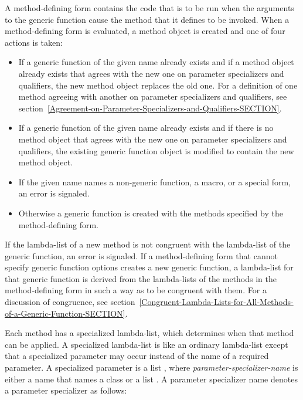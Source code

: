 A method-defining form contains the code that is to be run when the
arguments to the generic function cause the method that it defines to
be invoked.  When a method-defining form is evaluated, a method object
is created and one of four actions is taken:

\begin{itemize}

\item  If a generic function of the given name already exists
and if a method object already exists that agrees with the new one on
parameter specializers and qualifiers, the new method object replaces
the old one.  For a definition of one method agreeing with another on
parameter specializers and qualifiers, see
section~\ref{Agreement-on-Parameter-Specializers-and-Qualifiers-SECTION}.

\item  If a generic function of the given name already exists
and if there is no method object that agrees with the new one on
parameter specializers and qualifiers, the existing generic function
object is modified to contain the new method object.

\item  If the given name names a non-generic function, a macro,
or a special form, an error is signaled.

\item  Otherwise a generic function is created with the methods
specified by the method-defining form.

\end{itemize}

If the lambda-list of a new method is not congruent with the lambda-list
of the generic function, an error is signaled.  If a
method-defining form that cannot specify generic function options
creates a new generic function, a lambda-list for that generic
function is derived from the lambda-lists of the methods in the
method-defining form in such a way as to be congruent with them.  For
a discussion of {\bit congruence}, see
section~\ref{Congruent-Lambda-Lists-for-All-Methods-of-a-Generic-Function-SECTION}.

Each method has a {\bit specialized lambda-list}, which determines
when that method can be applied.  A specialized lambda-list is like
an ordinary lambda-list except that a {\bit specialized parameter\/}
may occur instead of the name of a required parameter.  A specialized parameter
is a list ,
where {\it parameter-specializer-name\/} is either
a name that names a class or a list .
A parameter specializer name denotes a parameter specializer as follows:

